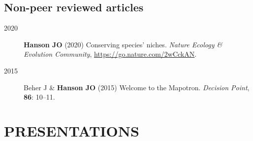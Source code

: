 \documentclass[12pt,a4paper]{article}
\begin{document}
\subsection*{Non-peer reviewed articles}
\begin{description}

\item[2020] \textbf{Hanson JO} (2020) Conserving species' niches. \textit{Nature Ecology \& Evolution Community}, \url{https://go.nature.com/2wCckAN}.

\item[2015] Beher J \& \textbf{Hanson JO} (2015) Welcome to the Mapotron. \textit{Decision Point}, \textbf{86}: 10--11.

\end{description}

\section*{PRESENTATIONS}
\end{document}
